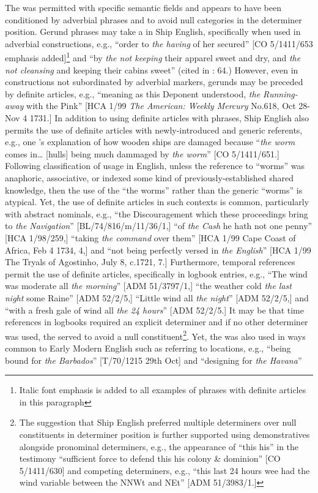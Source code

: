 The  was permitted with specific semantic fields and appears to have been conditioned by adverbial  phrases and to avoid null categories in the determiner position. Gerund phrases may take a  in Ship English, specifically when used in adverbial constructions, e.g., “order to \textit{the having} of her secured” [CO 5/1411/653 emphasis added]\footnote{Italic font emphasis is added to all examples of  phrases with definite articles in this paragraph} and “by \textit{the not keeping} their apparel sweet and dry, and \textit{the not cleansing} and keeping their cabins sweet” (cited in \citealt{Brown2011}: 64.) However, even in constructions not subordinated by adverbial markers, gerunds may be preceded by definite articles, e.g., “meaning as this Deponent understood, \textit{the Running-away} with the Pink” [HCA 1/99 \textit{The American: Weekly Mercury} No.618, Oct 28-Nov 4 1731.] In addition to using definite articles with  phrases, Ship English also permits the use of definite articles with newly-introduced and generic referents, e.g., one ’s explanation of how wooden ships are damaged because “\textit{the worm} comes in… [hulls] being much dammaged by \textit{the worm}” [CO 5/1411/651.] Following  classification of  usage in English, unless the reference to “worms” was anaphoric, associative, or indexed some kind of previously-established shared knowledge, then the use of the   “the worms” rather than the generic  “worms” is atypical. Yet, the use of definite articles in such contexts is common, particularly with abstract nominals, e.g., “the Discouragement which these proceedings bring to \textit{the Navigation}” [BL/74/816/m/11/36/1,] “of \textit{the Cash} he hath not one penny” [HCA 1/98/259,] “taking \textit{the command} over them” [HCA 1/99 Cape Coast of Africa, Feb 4 1734, 4,] and “not being perfectly versed in \textit{the English}” [HCA 1/99 The Tryals of Agostinho, July 8, c.1721, 7.] Furthermore, temporal references permit the use of definite articles, specifically in logbook entries, e.g., “The wind was moderate all \textit{the morning}” [ADM 51/3797/1,] “the weather cold \textit{the last night} some Raine” [ADM 52/2/5,] “Little wind all \textit{the night}” [ADM 52/2/5,] and “with a fresh gale of wind all \textit{the 24 hours}” [ADM 52/2/5.] It may be that time references in logbooks required an explicit determiner and if no other determiner was used, the  served to avoid a null constituent\footnote{The suggestion that Ship English preferred multiple determiners over null constituents in determiner position is further supported using demonstratives alongside  pronominal determiners, e.g., the appearance of “this his” in the testimony “sufficient force to defend this his colony \& dominion” [CO 5/1411/630] and competing determiners, e.g., “this last 24 hours wee had the wind variable between the NNWt and NEt” [ADM 51/3983/1.]}. Yet, the  was also used in ways common to Early Modern English such as referring to locations, e.g., “being bound for \textit{the Barbados}” [T/70/1215 29th Oct] and “designing for \textit{the Havana}” 
